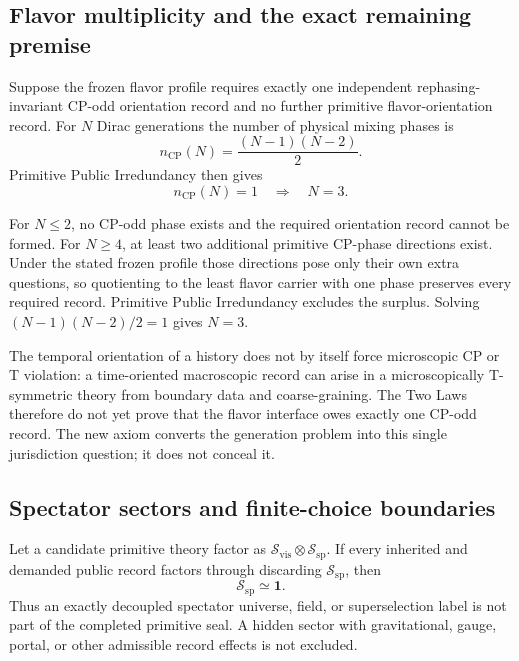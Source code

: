 \subsection{Flavor multiplicity and the exact remaining premise}

\begin{proposition}
\label{prop:ppi-three-generations}
Suppose the frozen flavor profile requires exactly one independent rephasing-invariant
CP-odd orientation record and no further primitive flavor-orientation record.  For
\(N\) Dirac generations the number of physical mixing phases is
\[
 n_{\mathrm{CP}}(N)=\frac{(N-1)(N-2)}2.
\]
Primitive Public Irredundancy then gives
\[
 n_{\mathrm{CP}}(N)=1
 \quad\Longrightarrow\quad
 \boxed{N=3}.
\]
\end{proposition}

\begin{proofsketch}
For \(N\le2\), no CP-odd phase exists and the required orientation record cannot be
formed.  For \(N\ge4\), at least two additional primitive CP-phase directions exist.
Under the stated frozen profile those directions pose only their own extra questions,
so quotienting to the least flavor carrier with one phase preserves every required
record.  Primitive Public Irredundancy excludes the surplus.  Solving
\((N-1)(N-2)/2=1\) gives \(N=3\).
\end{proofsketch}

\begin{remark}
The temporal orientation of a history does not by itself force microscopic CP or
T violation: a time-oriented macroscopic record can arise in a microscopically
T-symmetric theory from boundary data and coarse-graining.  The Two Laws therefore
do not yet prove that the flavor interface owes exactly one CP-odd record.  The new
axiom converts the generation problem into this single jurisdiction question; it
does not conceal it.
\end{remark}

\subsection{Spectator sectors and finite-choice boundaries}

\begin{proposition}
\label{prop:no-decoupled-spectator}
Let a candidate primitive theory factor as
\(\mathcal S_{\mathrm{vis}}\otimes\mathcal S_{\mathrm{sp}}\).  If every inherited
and demanded public record factors through discarding
\(\mathcal S_{\mathrm{sp}}\), then
\[
  \mathcal S_{\mathrm{sp}}\simeq\mathbf1.
\]
Thus an exactly decoupled spectator universe, field, or superselection label is not
part of the completed primitive seal.  A hidden sector with gravitational, gauge,
portal, or other admissible record effects is not excluded.
\end{proposition}


